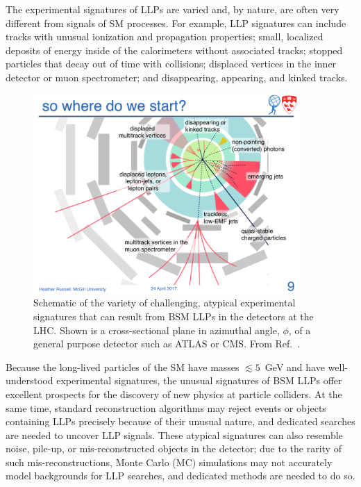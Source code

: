 The experimental signatures of LLPs are varied and, by nature, are often very different from signals of SM processes.  For example, LLP signatures can include tracks with unusual ionization and propagation properties; small, localized deposits of energy inside of the calorimeters without associated tracks; stopped particles that decay out of time with collisions; displaced vertices in the inner detector or muon spectrometer; and disappearing, appearing, and kinked tracks.

\begin{figure}[htb]
\centering
\includegraphics[width=0.9\textwidth]{plots/Heather_Russell_20170424_LLPs_Slide9.pdf}
\caption{Schematic of the variety of challenging, atypical experimental signatures that can result from BSM LLPs in the detectors at the LHC.  Shown is a cross-sectional plane in azimuthal angle, $\phi$, of a general purpose detector such as ATLAS or CMS.  From Ref.~\cite{Russell:2017AprilWorkshop}.}
 \label{fig:LLPSignaturesWheel}
\end{figure}

Because the long-lived particles of the SM have masses $\lesssim5$~GeV and have well-understood experimental signatures, the unusual signatures of BSM LLPs offer excellent prospects for the discovery of new physics at particle colliders.
At the same time, standard reconstruction algorithms may reject events or objects containing LLPs precisely because of their unusual nature, and dedicated searches are needed to uncover LLP signals.
These atypical signatures can also resemble noise, pile-up, or mis-reconstructed objects in the detector; due to the rarity of such mis-reconstructions, Monte Carlo (MC) simulations may not accurately model backgrounds for LLP searches, and dedicated methods are needed to do so.

